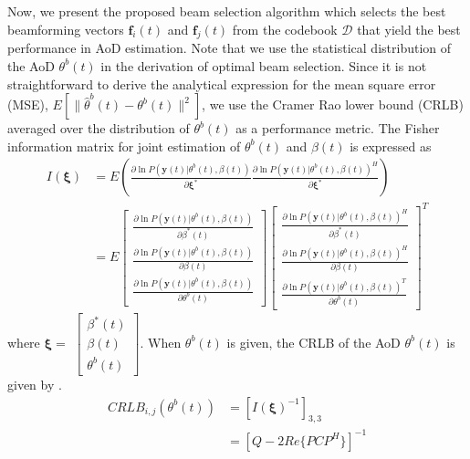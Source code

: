 \documentclass[conference]{IEEEtran}
\begin{document}
Now, we present the proposed beam selection algorithm which selects the best beamforming vectors $\mathbf{f}_{i}(t)$ and $\mathbf{f}_{j}(t)$ from the codebook $\mathcal{D}$ that yield
the best performance in AoD estimation.
Note that we use the statistical distribution of the AoD $\theta^{b}(t)$ in the derivation of optimal beam selection.
Since it is not straightforward to derive the analytical expression for the mean square error (MSE),  $E\left[\| \hat{\theta}^{b}(t) - {\theta}^{b}(t)  \|^2 \right]$,
we use the Cramer Rao lower bound (CRLB) averaged over the distribution of $\theta^{b}(t)$ as a performance metric.
The Fisher information matrix for joint estimation of $\theta^{b}(t)$ and $\beta(t)$ is expressed as
\begin{align}
  I(\mathbf{\xi}) & = E(\frac{\partial \ln P(\mathbf{y}(t)|\theta^{b}(t), \beta(t))}{\partial \mathbf{\xi}^{\ast}}  \frac{\partial \ln P(\mathbf{y}(t)|\theta^{b}(t), \beta(t))^{H}}{\partial \mathbf{\xi}^{\ast}}) \nonumber \\
  & = E
  \begin{bmatrix}
    \frac{\partial \ln P(\mathbf{y}(t)|\theta^{b}(t), \beta(t))}{\partial \beta^\ast(t)} \\ \frac{\partial \ln P(\mathbf{y}(t)|\theta^{b}(t), \beta(t))}{\partial \beta(t)} \\ \frac{\partial \ln P(\mathbf{y}(t)|\theta^{b}(t), \beta(t))}{\partial \theta^{b}(t)}
  \end{bmatrix}
  \begin{bmatrix}
    \frac{\partial \ln P(\mathbf{y}(t)|\theta^{b}(t), \beta(t))^{H}}{\partial \beta^\ast(t)} \\\frac{\partial \ln P(\mathbf{y}(t)|\theta^{b}(t), \beta(t))^{H}}{\partial \beta(t)} \\ \frac{\partial \ln P(\mathbf{y}(t)|\theta^{b}(t), \beta(t))^{T}}{\partial \theta^{b}(t)}
  \end{bmatrix}^{T}
\end{align}
where $\mathbf{\xi}=$
$\begin{bmatrix}
       \beta^{\ast}(t) \\
       \beta(t) \\
       \theta^{b}(t)
\end{bmatrix}$. When $\theta^{b}(t)$ is given, the CRLB of the AoD $\theta^{b}(t)$ is given by \cite{ref:complex-CRLB}.
\begin{align}
  CRLB_{i,j}(\theta^{b}(t)) &= [  I(\mathbf{\xi})^{-1}]_{3,3} \\
  & =  [Q-2Re\{PCP^{H}\}]^{-1}
\end{align}
\end{document}
